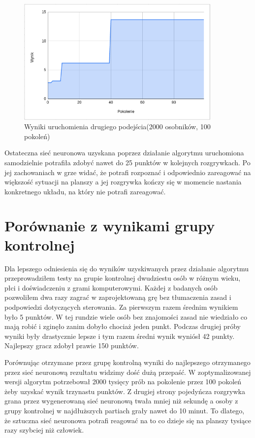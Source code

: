 \documentclass[12pt, oneside, a4paper]{report}
\begin{document}
\begin{figure}[h]
	\centering
	\includegraphics[width=10cm]{fig44.png}
	\caption{Wyniki uruchomienia drugiego podejścia(2000 osobników, 100 pokoleń)}
	\label{fig: 4.4}
\end{figure}

Ostateczna sieć neuronowa uzyskana poprzez działanie algorytmu uruchomiona samodzielnie potrafiła zdobyć nawet do 25 punktów w kolejnych rozgrywkach. Po jej zachowaniach w grze widać, że potrafi rozpoznać i odpowiednio zareagować na większość sytuacji na planszy a jej rozgrywka kończy się w momencie nastania konkretnego układu, na który nie potrafi zareagować.

\section{Porównanie z wynikami grupy kontrolnej}

Dla lepszego odniesienia się do wyników uzyskiwanych przez działanie algorytmu przeprowadziłem testy na grupie kontrolnej dwudziestu osób w różnym wieku, płci i doświadczeniu z grami komputerowymi. Każdej z badanych osób pozwoliłem dwa razy zagrać w zaprojektowaną grę bez tłumaczenia zasad i podpowiedzi dotyczących sterowania. Za pierwszym razem średnim wynikiem było 5 punktów. W tej rundzie wiele osób bez znajomości zasad nie wiedziało co mają robić i zginęło zanim dobyło chociaż jeden punkt. Podczas drugiej próby wyniki były drastycznie lepsze i tym razem średni wynik wyniósł 42 punkty. Najlepszy gracz zdobył prawie 150 punktów. 

Porównując otrzymane przez grupę kontrolną wyniki do najlepszego otrzymanego przez sieć neuronową rezultatu widzimy dość dużą przepaść. W zoptymalizowanej wersji algorytm potrzebował 2000 tysięcy prób na pokolenie przez 100 pokoleń żeby uzyskać wynik trzynastu punktów. Z drugiej strony pojedyńcza rozgrywka grana przez wygenerowaną sieć neuronową twała mniej niż sekundę a osoby z grupy kontrolnej w najdłuższych partiach grały nawet do 10 minut. To dlatego, że sztuczna sieć neuronowa potrafi reagować na to co dzieje się na planszy tysiące razy szybciej niż człowiek. 
\end{document}
